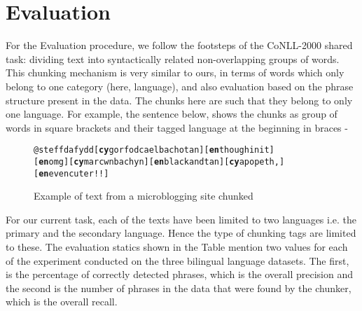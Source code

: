 \documentclass[11pt]{article}
\begin{document}
\section{Evaluation}
\label{sec:eval}

For the Evaluation procedure, we follow the footsteps of the CoNLL-2000 shared task: dividing text into syntactically related non-overlapping groups of words. This chunking mechanism \cite{tjong2003introduction} is very similar to ours, in terms of words which only belong to one category (here, language), and also evaluation based on the phrase structure present in the data. The chunks here are such that they belong to only one language. For example, the sentence below, shows the chunks as group of words in square brackets and their tagged language at the beginning in braces - \\

\begin{figure}
\begin{small}
\begin{alltt}
@steffdafydd [\textbf{cy} gorfod cael bach o tan] [\textbf{en} though init]
[\textbf{en} omg] [\textbf{cy} mar cwn bach yn] [\textbf{en} black and tan] [\textbf{cy} a popeth,] [\textbf{en} even cuter!!]
\end{alltt}
\end{small}
\label{fig:tweets}
\caption{Example of text from a microblogging site chunked}
\end{figure}

For our current task, each of the texts have been limited to two languages i.e. the primary and the secondary language. Hence the type of chunking tags are limited to these. The evaluation statics shown in the Table mention two values for each of the experiment conducted on the three bilingual language datasets. The first, is the percentage of correctly detected phrases, which is the overall precision and the second is the number of phrases in the data that were found by the chunker, which is the overall recall. \\
\end{document}
